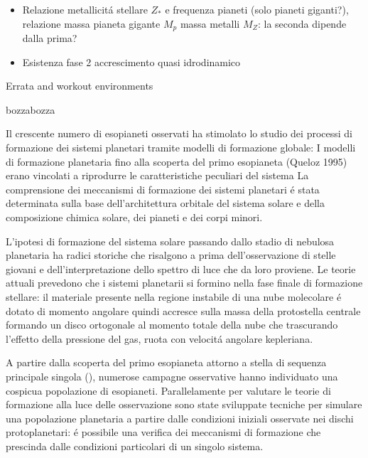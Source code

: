 \documentclass[twoside,11pt,fleqn]{memoir}%
\def\versione{bozza}%
\def\bozza{bozza}
\begin{document}
\begin{workout}
\begin{itemize}
\item Relazione metallicit\'a stellare $Z_*$ e frequenza pianeti (solo pianeti giganti?), relazione massa pianeta gigante $M_p$ massa metalli $M_Z$: la seconda dipende dalla prima?
\item Esistenza fase 2 accrescimento quasi idrodinamico 
\end{itemize}
\end{workout}
\tableofcontents*
\mainmatter
{}
\cleartorecto
\begin{workout}
Errata and workout environments
\end{workout}

\ifx\versione\bozza%
\woc
\fi

\begin{errata}
Il crescente numero di esopianeti osservati ha stimolato lo studio dei processi di formazione dei sistemi planetari tramite modelli di formazione globale: 
I modelli di formazione planetaria fino alla scoperta del primo esopianeta (Queloz 1995) erano vincolati a riprodurre le caratteristiche peculiari del sistema
La comprensione dei meccanismi di formazione dei sistemi planetari \'e stata determinata sulla base dell'architettura orbitale del sistema solare e della composizione chimica solare, dei pianeti e dei corpi minori.
\end{errata}

L'ipotesi di formazione del sistema solare passando dallo stadio di nebulosa planetaria ha radici storiche che risalgono a prima dell'osservazione di stelle giovani e dell'interpretazione dello spettro di luce che da loro proviene.
Le teorie attuali prevedono che i sistemi planetarii si formino nella fase finale di formazione stellare: il materiale presente nella regione instabile di una nube molecolare \'e dotato di momento angolare quindi accresce sulla massa della protostella centrale formando un disco ortogonale al momento totale della nube che trascurando l'effetto della pressione del gas, ruota con velocit\'a angolare kepleriana.

A partire dalla scoperta del primo esopianeta attorno a stella di sequenza principale singola (\cite{mayor1995jupiter}), numerose campagne osservative hanno individuato una cospicua popolazione di esopianeti. Parallelamente per valutare le teorie di formazione alla luce delle osservazione sono state sviluppate tecniche per simulare una popolazione planetaria a partire dalle condizioni iniziali osservate nei dischi protoplanetari: \'e possibile una verifica dei meccanismi di formazione che prescinda dalle condizioni particolari di un singolo sistema.
\end{document}

